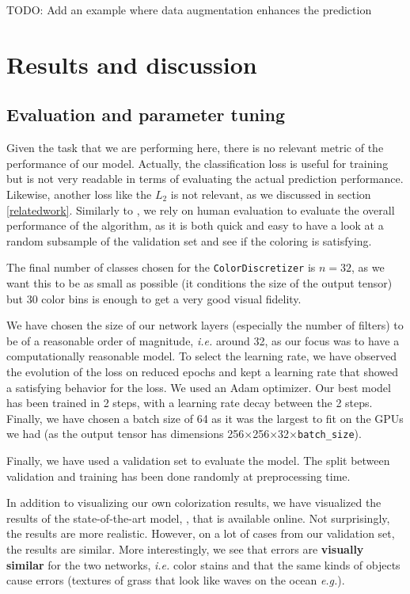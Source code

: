 \documentclass[10pt,twocolumn,letterpaper]{article}
\begin{document}
TODO: Add an example where data augmentation enhances the prediction

\section{Results and discussion}
\subsection{Evaluation and parameter tuning}

Given the task that we are performing here, there is no relevant metric of the performance of our model. Actually, the classification loss is useful for training but is not very readable in terms of evaluating the actual prediction performance. Likewise, another loss like the $L_2$ is not relevant, as we discussed in section \ref{relatedwork}. Similarly to \cite{zhang2016colorful}, we rely on human evaluation to evaluate the overall performance of the algorithm, as it is both quick and easy to have a look at a random subsample of the validation set and see if the coloring is satisfying.

The final number of classes chosen for the \texttt{ColorDiscretizer} is $n=32$, as we want this to be as small as possible (it conditions the size of the output tensor) but 30 color bins is enough to get a very good visual fidelity.

We have chosen the size of our network layers (especially the number of filters) to be of a reasonable order of magnitude, \textit{i.e.} around 32, as our focus was to have a computationally reasonable model. To select the learning rate, we have observed the evolution of the loss on reduced epochs and kept a learning rate that showed a satisfying behavior for the loss. We used an Adam optimizer. Our best model has been trained in 2 steps, with a learning rate decay between the 2 steps. Finally, we have chosen a batch size of 64 as it was the largest to fit on the GPUs we had (as the output tensor has dimensions 256$\times$256$\times$32$\times$\texttt{batch\_size}).

Finally, we have used a validation set to evaluate the model. The split between validation and training  has been done randomly at preprocessing time.

In addition to visualizing our own colorization results, we have visualized the results of the state-of-the-art model, \cite{zhang2016colorful}, that is available online. Not surprisingly, the results are more realistic. However, on a lot of cases from our validation set, the results are similar. More interestingly, we see that errors are \textbf{visually similar} for the two networks, \textit{i.e.} color stains and that the same kinds of objects cause errors (textures of grass that look like waves on the ocean \textit{e.g.}). 
\end{document}
